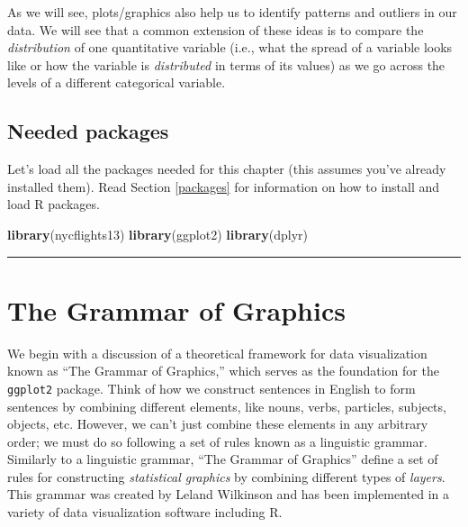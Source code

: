 \documentclass[12pt, krantz2,]{krantz}
\makeatletter
\newenvironment{Shaded}{\begin{snugshade}}{\end{snugshade}}
\newcommand{\KeywordTok}[1]{\textcolor[rgb]{0.27,0.27,0.27}{\textbf{#1}}}
\newcommand{\NormalTok}[1]{#1}
\newenvironment{kframe}{%
\medskip{}
\setlength{\fboxsep}{.8em}
 \def\at@end@of@kframe{}%
 \ifinner\ifhmode%
  \def\at@end@of@kframe{\end{minipage}}%
  \begin{minipage}{\columnwidth}%
 \fi\fi%
 \def\FrameCommand##1{\hskip\@totalleftmargin \hskip-\fboxsep
 \colorbox{shadecolor}{##1}\hskip-\fboxsep
     \hskip-\linewidth \hskip-\@totalleftmargin \hskip\columnwidth}%
 \MakeFramed {\advance\hsize-\width
   \@totalleftmargin\z@ \linewidth\hsize
   \@setminipage}}%
 {\par\unskip\endMakeFramed%
 \at@end@of@kframe}
\renewenvironment{Shaded}{\begin{kframe}}{\end{kframe}}
\makeatother
\begin{document}
As we will see, plots/graphics also help us to identify patterns and outliers in our data. We will see that a common extension of these ideas is to compare the \emph{distribution} of one quantitative variable (i.e., what the spread of a variable looks like or how the variable is \emph{distributed} in terms of its values) as we go across the levels of a different categorical variable.

\hypertarget{needed-packages}{%
\subsection*{Needed packages}\label{needed-packages}}


Let's load all the packages needed for this chapter (this assumes you've already installed them). Read Section \ref{packages} for information on how to install and load R packages.

\begin{Shaded}
\begin{Highlighting}[]
\KeywordTok{library}\NormalTok{(nycflights13)}
\KeywordTok{library}\NormalTok{(ggplot2)}
\KeywordTok{library}\NormalTok{(dplyr)}
\end{Highlighting}
\end{Shaded}

\begin{center}\rule{0.5\linewidth}{\linethickness}\end{center}

\hypertarget{grammarofgraphics}{%
\section{The Grammar of Graphics}\label{grammarofgraphics}}

We begin with a discussion of a theoretical framework for data visualization known as ``The Grammar of Graphics,'' which serves as the foundation for the \texttt{ggplot2} package. Think of how we construct sentences in English to form sentences by combining different elements, like nouns, verbs, particles, subjects, objects, etc. However, we can't just combine these elements in any arbitrary order; we must do so following a set of rules known as a linguistic grammar. Similarly to a linguistic grammar, ``The Grammar of Graphics'' define a set of rules for constructing \emph{statistical graphics} by combining different types of \emph{layers}. This grammar was created by Leland Wilkinson \citep{wilkinson2005} and has been implemented in a variety of data visualization software including R.
\end{document}
